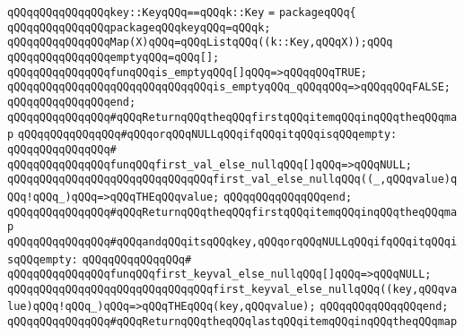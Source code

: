 \verb|qQQqqQQqqQQqqQQqkey::KeyqQQq==qQQqk::Key|\newline
\verb|=|\newline
\verb|packageqQQq{|\newline
\verb|qQQqqQQqqQQqqQQqpackageqQQqkeyqQQq=qQQqk;|\newline
\newline
\verb|qQQqqQQqqQQqqQQqMap(X)qQQq=qQQqListqQQq((k::Key,qQQqX));qQQq|\newline
\newline
\verb|qQQqqQQqqQQqqQQqemptyqQQq=qQQq[];|\newline
\newline
\verb|qQQqqQQqqQQqqQQqfunqQQqis_emptyqQQq[]qQQq=>qQQqqQQqTRUE;|\newline
\verb|qQQqqQQqqQQqqQQqqQQqqQQqqQQqqQQqis_emptyqQQq_qQQqqQQq=>qQQqqQQqFALSE;|\newline
\verb|qQQqqQQqqQQqqQQqend;|\newline
\newline
\verb|qQQqqQQqqQQqqQQq#qQQqReturnqQQqtheqQQqfirstqQQqitemqQQqinqQQqtheqQQqmap|\newline
\verb|qQQqqQQqqQQqqQQq#qQQqorqQQqNULLqQQqifqQQqitqQQqisqQQqempty:|\newline
\verb|qQQqqQQqqQQqqQQq#|\newline
\verb|qQQqqQQqqQQqqQQqfunqQQqfirst_val_else_nullqQQq[]qQQq=>qQQqNULL;|\newline
\verb|qQQqqQQqqQQqqQQqqQQqqQQqqQQqqQQqfirst_val_else_nullqQQq((_,qQQqvalue)qQQq!qQQq_)qQQq=>qQQqTHEqQQqvalue;|\newline
\verb|qQQqqQQqqQQqqQQqend;|\newline
\newline
\verb|qQQqqQQqqQQqqQQq#qQQqReturnqQQqtheqQQqfirstqQQqitemqQQqinqQQqtheqQQqmap|\newline
\verb|qQQqqQQqqQQqqQQq#qQQqandqQQqitsqQQqkey,qQQqorqQQqNULLqQQqifqQQqitqQQqisqQQqempty:|\newline
\verb|qQQqqQQqqQQqqQQq#|\newline
\verb|qQQqqQQqqQQqqQQqfunqQQqfirst_keyval_else_nullqQQq[]qQQq=>qQQqNULL;|\newline
\verb|qQQqqQQqqQQqqQQqqQQqqQQqqQQqqQQqfirst_keyval_else_nullqQQq((key,qQQqvalue)qQQq!qQQq_)qQQq=>qQQqTHEqQQq(key,qQQqvalue);|\newline
\verb|qQQqqQQqqQQqqQQqend;|\newline
\newline
\verb|qQQqqQQqqQQqqQQq#qQQqReturnqQQqtheqQQqlastqQQqitemqQQqinqQQqtheqQQqmap|\newline
